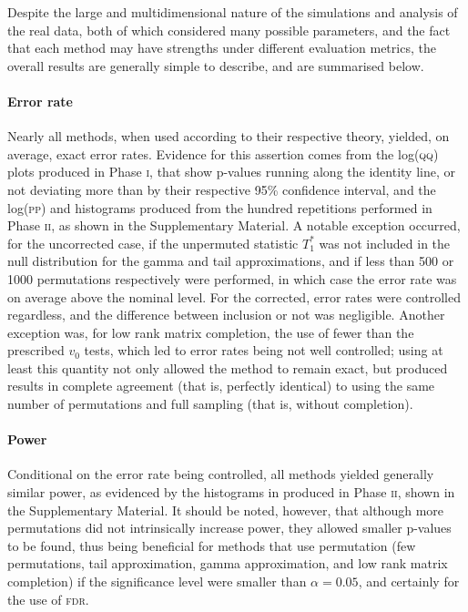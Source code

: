 Despite the large and multidimensional nature of the simulations and analysis of the real data, both of which considered many possible parameters, and the fact that each method may have strengths under different evaluation metrics, the overall results are generally simple to describe, and are summarised below.

\paragraph{Error rate} Nearly all methods, when used according to their respective theory, yielded, on average, exact error rates. Evidence for this assertion comes from the log(\textsc{qq}) plots produced in Phase \textsc{i}, that show p-values running along the identity line, or not deviating more than by their respective 95\% confidence interval, and the log(\textsc{pp}) and histograms produced from the hundred repetitions performed in Phase \textsc{ii}, as shown in the Supplementary Material. A notable exception occurred, for the uncorrected case, if the unpermuted statistic $T^*_1$ was not included in the null distribution for the gamma and tail approximations, and if less than 500 or 1000 permutations respectively were performed, in which case the error rate was on average above the nominal level. For the corrected, error rates were controlled regardless, and the difference between inclusion or not was negligible. Another exception was, for low rank matrix completion, the use of fewer than the prescribed $v_0$ tests, which led to error rates being not well controlled; using at least this quantity not only allowed the method to remain exact, but produced results in complete agreement (that is, perfectly identical) to using the same number of permutations and full sampling (that is, without completion).

\paragraph{Power} Conditional on the error rate being controlled, all methods yielded generally similar power, as evidenced by the histograms in produced in Phase \textsc{ii}, shown in the Supplementary Material. It should be noted, however, that although more permutations did not intrinsically increase power, they allowed smaller p-values to be found, thus being beneficial for methods that use permutation (few permutations, tail approximation, gamma approximation, and low rank matrix completion) if the significance level were smaller than $\alpha = 0.05$, and certainly for the use of \textsc{fdr}.

